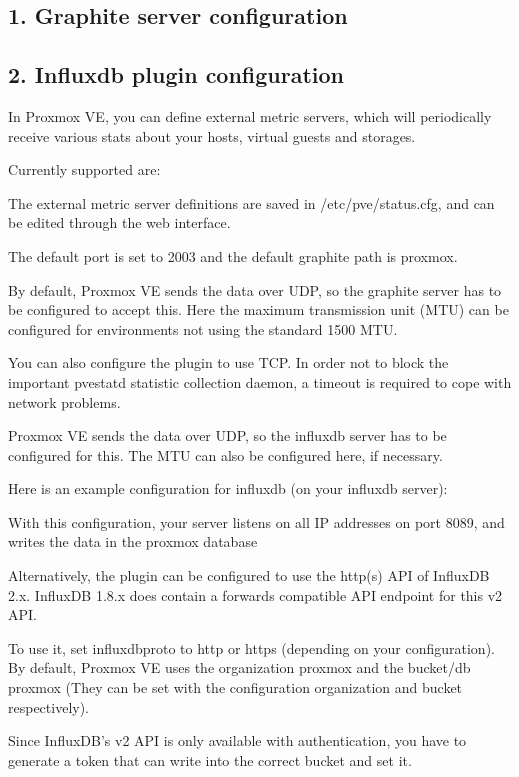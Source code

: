 \subsection{1. Graphite server configuration}

\subsection{2. Influxdb plugin configuration}

In Proxmox VE, you can define external metric servers, which will periodically receive various stats about your hosts, virtual guests and storages.

Currently supported are:

The external metric server definitions are saved in /etc/pve/status.cfg, and can be edited through the web interface.

The default port is set to 2003 and the default graphite path is proxmox.

By default, Proxmox VE sends the data over UDP, so the graphite server has to be configured to accept this. Here the maximum transmission unit (MTU) can be configured for environments not using the standard 1500 MTU.

You can also configure the plugin to use TCP. In order not to block the important pvestatd statistic collection daemon, a timeout is required to cope with network problems.

Proxmox VE sends the data over UDP, so the influxdb server has to be configured for this. The MTU can also be configured here, if necessary.

Here is an example configuration for influxdb (on your influxdb server):

With this configuration, your server listens on all IP addresses on port 8089, and writes the data in the proxmox database

Alternatively, the plugin can be configured to use the http(s) API of InfluxDB 2.x. InfluxDB 1.8.x does contain a forwards compatible API endpoint for this v2 API.

To use it, set influxdbproto to http or https (depending on your configuration). By default, Proxmox VE uses the organization proxmox and the bucket/db proxmox (They can be set with the configuration organization and bucket respectively).

Since InfluxDB’s v2 API is only available with authentication, you have to generate a token that can write into the correct bucket and set it.

